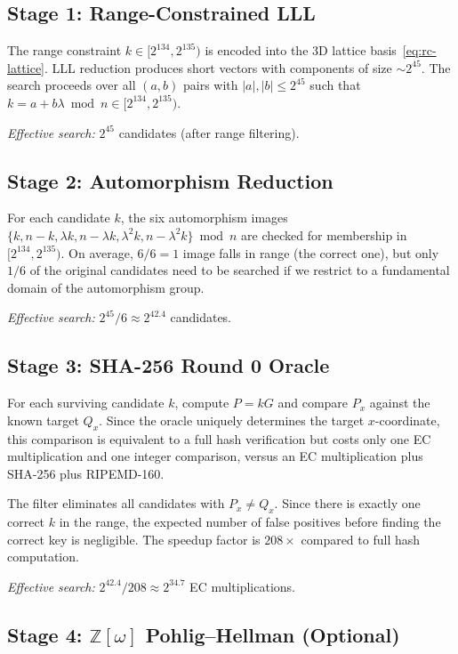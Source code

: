\documentclass[11pt,a4paper]{article}
\theoremstyle{definition}
\newcommand{\Zomega}{\mathbb{Z}[\omega]}
\begin{document}
\subsection{Stage 1: Range-Constrained LLL}

The range constraint $k \in [2^{134}, 2^{135})$ is encoded into the 3D lattice basis~\eqref{eq:rc-lattice}. LLL reduction produces short vectors with components of size $\sim 2^{45}$. The search proceeds over all $(a, b)$ pairs with $|a|, |b| \leq 2^{45}$ such that $k = a + b\lambda \bmod n \in [2^{134}, 2^{135})$.

\textit{Effective search:} $2^{45}$ candidates (after range filtering).

\subsection{Stage 2: Automorphism Reduction}

For each candidate $k$, the six automorphism images $\{k, n-k, \lambda k, n-\lambda k, \lambda^2 k, n-\lambda^2 k\} \bmod n$ are checked for membership in $[2^{134}, 2^{135})$. On average, $6/6 = 1$ image falls in range (the correct one), but only $1/6$ of the original candidates need to be searched if we restrict to a fundamental domain of the automorphism group.

\textit{Effective search:} $2^{45}/6 \approx 2^{42.4}$ candidates.

\subsection{Stage 3: SHA-256 Round 0 Oracle}

For each surviving candidate $k$, compute $P = kG$ and compare $P_x$ against the known target $Q_x$. Since the oracle uniquely determines the target $x$-coordinate, this comparison is equivalent to a full hash verification but costs only one EC multiplication and one integer comparison, versus an EC multiplication plus SHA-256 plus RIPEMD-160.

The filter eliminates all candidates with $P_x \neq Q_x$. Since there is exactly one correct $k$ in the range, the expected number of false positives before finding the correct key is negligible. The speedup factor is $208\times$ compared to full hash computation.

\textit{Effective search:} $2^{42.4}/208 \approx 2^{34.7}$ EC multiplications.

\subsection{Stage 4: $\Zomega$ Pohlig--Hellman (Optional)}
\end{document}
